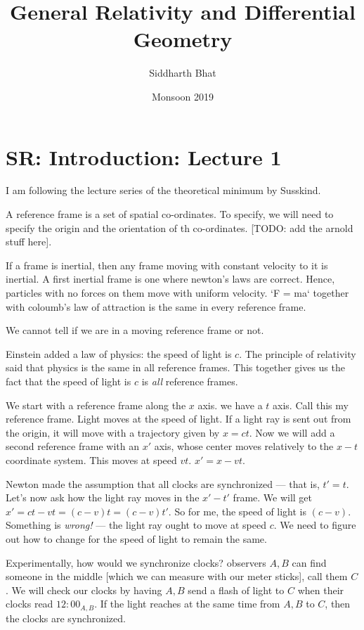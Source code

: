 \documentclass[11pt]{book}
\title{General Relativity and Differential Geometry}
\author{Siddharth Bhat}
\date{Monsoon 2019}
\begin{document}
\maketitle
\tableofcontents

\chapter{SR: Introduction: Lecture 1}

I am following the lecture series of the theoretical minimum by Susskind.

A reference frame is a set of spatial co-ordinates. To specify, we will need
to specify the origin and the orientation of th co-ordinates.
[TODO: add the arnold stuff here].

If a frame is inertial, then any frame moving with constant velocity to it
is inertial. A first inertial frame is one where newton's laws are correct.
Hence, particles with no forces on them move with uniform velocity.
`F = ma` together with coloumb's law of attraction is the same in every
reference frame.

We cannot tell if we are in a moving reference frame or not.

Einstein added a law of physics: the speed of light is $c$. The principle of
relativity said that physics is the same in all reference frames. This
together gives us the fact that the speed of light is $c$ is \emph{all}
reference frames.

We start with a reference frame along the $x$ axis. we have a $t$ axis. Call
this my reference frame. Light moves at the speed of light. If a light
ray is sent out from the origin, it will move with a trajectory given
by $x = ct$. Now we will add a second reference frame with an $x'$ axis,
whose center moves relatively to the $x-t$ coordinate system. This
moves at speed $vt$. $x' = x - vt$.

Newton made the assumption that all clocks are synchronized --- that is,
$t' = t$. Let's now ask how the light ray moves in the $x'-t'$ frame.
We will get $x' = ct - vt = (c - v)t = (c - v)t'$. So for me, the
speed of light is $(c - v)$. Something is \emph{wrong!} --- the light ray
ought to move at speed $c$. We need to figure out how to change for the
speed of light to remain the same.

Experimentally, how would we synchronize clocks? observers $A, B$ can
find someone in the middle [which we can measure with our meter sticks],
call them $C$. We will check our clocks by having $A, B$ send a flash of light
to $C$ when their clocks read $12:00_{A, B}$. If the light reaches at the same
time from $A, B$ to $C$, then the clocks are synchronized.
\end{document}

